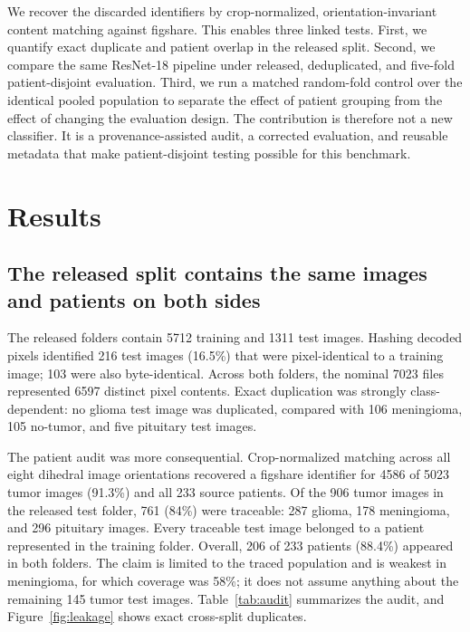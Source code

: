 ﻿\documentclass[11pt]{article}
\begin{document}
We recover the discarded identifiers by crop-normalized, orientation-invariant content matching against figshare. This enables three linked tests. First, we quantify exact duplicate and patient overlap in the released split. Second, we compare the same ResNet-18 pipeline under released, deduplicated, and five-fold patient-disjoint evaluation. Third, we run a matched random-fold control over the identical pooled population to separate the effect of patient grouping from the effect of changing the evaluation design. The contribution is therefore not a new classifier. It is a provenance-assisted audit, a corrected evaluation, and reusable metadata that make patient-disjoint testing possible for this benchmark.

\section{Results}
\subsection{The released split contains the same images and patients on both sides}
The released folders contain 5712 training and 1311 test images. Hashing decoded pixels identified 216 test images (16.5\%) that were pixel-identical to a training image; 103 were also byte-identical. Across both folders, the nominal 7023 files represented 6597 distinct pixel contents. Exact duplication was strongly class-dependent: no glioma test image was duplicated, compared with 106 meningioma, 105 no-tumor, and five pituitary test images.

The patient audit was more consequential. Crop-normalized matching across all eight dihedral image orientations recovered a figshare identifier for 4586 of 5023 tumor images (91.3\%) and all 233 source patients. Of the 906 tumor images in the released test folder, 761 (84\%) were traceable: 287 glioma, 178 meningioma, and 296 pituitary images. Every traceable test image belonged to a patient represented in the training folder. Overall, 206 of 233 patients (88.4\%) appeared in both folders. The claim is limited to the traced population and is weakest in meningioma, for which coverage was 58\%; it does not assume anything about the remaining 145 tumor test images. Table~\ref{tab:audit} summarizes the audit, and Figure~\ref{fig:leakage} shows exact cross-split duplicates.
\end{document}
